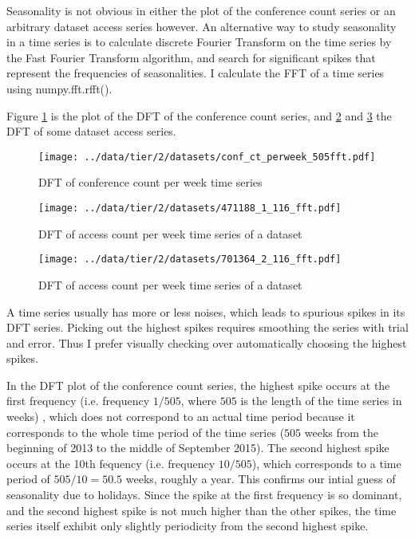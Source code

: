 \documentclass[final, 12pt]{elsarticle}
\begin{document}
Seasonality is not obvious in either the plot of the conference count series  or an arbitrary dataset access series however.
An alternative way to study seasonality in a time series is to calculate discrete Fourier Transform on the time series by the Fast Fourier Transform algorithm, and search for significant spikes that represent the frequencies of seasonalities.
I calculate the FFT of a time series using numpy.fft.rfft().
 
Figure \ref{cffft} is the plot of the DFT of the conference count series, and  \ref{dsfft1} and \ref{dsfft2} the DFT of some dataset access series.

\begin{figure}
\begin{center} 
\texttt{[image: ../data/tier/2/datasets/conf\_ct\_perweek\_505fft.pdf]}
\end{center}
\caption{DFT of conference count per week time series}
\label{cffft}
\end{figure}

\begin{figure}
\begin{center}
\texttt{[image: ../data/tier/2/datasets/471188\_1\_116\_fft.pdf]}
\end{center}
\caption{DFT of access count per week time series  of a dataset}
\label{dsfft1}
\end{figure}

\begin{figure}
\begin{center}
\texttt{[image: ../data/tier/2/datasets/701364\_2\_116\_fft.pdf]}
\end{center}
\caption{DFT of access count per week time series of a dataset}
\label{dsfft2}
\end{figure}

A time series usually has more or less noises, which leads to spurious spikes in its DFT series. Picking out the highest spikes requires smoothing the series with trial and error.
Thus I prefer visually checking over automatically choosing the highest spikes.

In the DFT plot of the conference count series, the highest spike occurs at the first frequency (i.e. frequency $1/505$, where $505$ is the length of the time series in weeks) , which does not correspond to an actual time period because it corresponds to the whole time period of the time series ($505$ weeks from the beginning of 2013 to the middle of September 2015). The second highest spike occurs at the 10th fequency (i.e. frequency $10/505$), which corresponds to a time period of $505/10 = 50.5$ weeks, roughly a year. This confirms our intial guess of seasonality due to holidays. Since the spike at the first frequency is so dominant, and the second highest spike is not much higher than the other spikes, the time series itself exhibit only slightly periodicity from the second highest spike.
\end{document}
